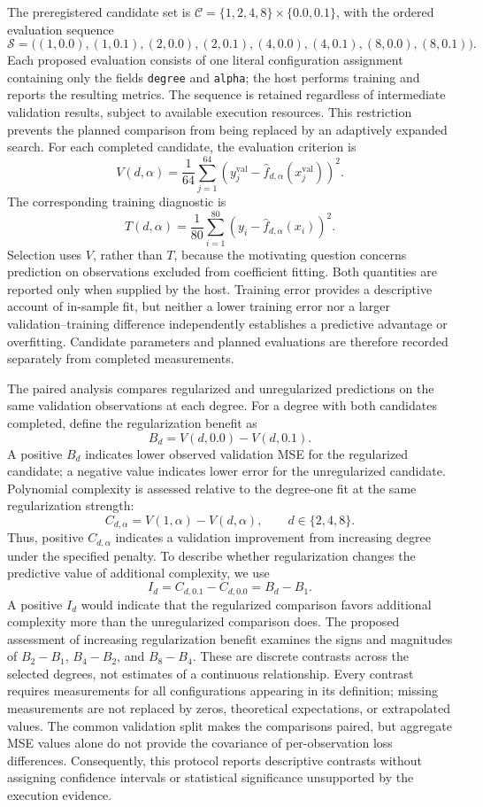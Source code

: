 \documentclass[11pt]{article}
\begin{document}
The preregistered candidate set is \(\mathcal{C}=\{1,2,4,8\}\times\{0.0,0.1\}\), with the ordered evaluation sequence
\[
\mathcal{S}
=
\bigl(
(1,0.0),(1,0.1),
(2,0.0),(2,0.1),
(4,0.0),(4,0.1),
(8,0.0),(8,0.1)
\bigr).
\]
Each proposed evaluation consists of one literal configuration assignment containing only the fields \texttt{degree} and \texttt{alpha}; the host performs training and reports the resulting metrics. The sequence is retained regardless of intermediate validation results, subject to available execution resources. This restriction prevents the planned comparison from being replaced by an adaptively expanded search. For each completed candidate, the evaluation criterion is
\[
V(d,\alpha)
=
\frac{1}{64}
\sum_{j=1}^{64}
\left(
y_j^{\mathrm{val}}
-
\widehat f_{d,\alpha}(x_j^{\mathrm{val}})
\right)^2.
\]
The corresponding training diagnostic is
\[
T(d,\alpha)
=
\frac{1}{80}
\sum_{i=1}^{80}
\left(
y_i-\widehat f_{d,\alpha}(x_i)
\right)^2.
\]
Selection uses \(V\), rather than \(T\), because the motivating question concerns prediction on observations excluded from coefficient fitting. Both quantities are reported only when supplied by the host. Training error provides a descriptive account of in-sample fit, but neither a lower training error nor a larger validation--training difference independently establishes a predictive advantage or overfitting. Candidate parameters and planned evaluations are therefore recorded separately from completed measurements.

The paired analysis compares regularized and unregularized predictions on the same validation observations at each degree. For a degree with both candidates completed, define the regularization benefit as
\[
B_d=V(d,0.0)-V(d,0.1).
\]
A positive \(B_d\) indicates lower observed validation MSE for the regularized candidate; a negative value indicates lower error for the unregularized candidate. Polynomial complexity is assessed relative to the degree-one fit at the same regularization strength:
\[
C_{d,\alpha}=V(1,\alpha)-V(d,\alpha),
\qquad d\in\{2,4,8\}.
\]
Thus, positive \(C_{d,\alpha}\) indicates a validation improvement from increasing degree under the specified penalty. To describe whether regularization changes the predictive value of additional complexity, we use
\[
I_d
=
C_{d,0.1}-C_{d,0.0}
=
B_d-B_1.
\]
A positive \(I_d\) would indicate that the regularized comparison favors additional complexity more than the unregularized comparison does. The proposed assessment of increasing regularization benefit examines the signs and magnitudes of \(B_2-B_1\), \(B_4-B_2\), and \(B_8-B_4\). These are discrete contrasts across the selected degrees, not estimates of a continuous relationship. Every contrast requires measurements for all configurations appearing in its definition; missing measurements are not replaced by zeros, theoretical expectations, or extrapolated values. The common validation split makes the comparisons paired, but aggregate MSE values alone do not provide the covariance of per-observation loss differences. Consequently, this protocol reports descriptive contrasts without assigning confidence intervals or statistical significance unsupported by the execution evidence.
\end{document}
